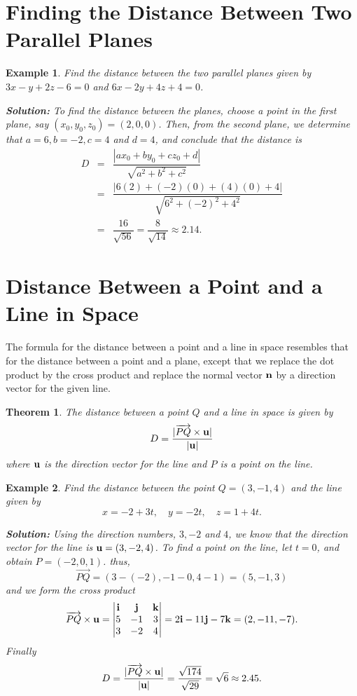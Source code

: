 \documentclass[titlepage,a4paper,12pt]{report}
\newtheorem{example}{Example}[section]
\newtheorem{theorem}{Theorem}[section]
\begin{document}
\section{Finding the Distance Between Two Parallel Planes}
\begin{example}
Find the distance between the two parallel planes given by $3x-y+2z-6=0$ and $6x-2y+4z+4=0$.

\noindent \textbf{Solution:} To find the distance between the planes, choose a point in the first plane, say $(x_0,y_0,z_0)=(2,0,0)$. Then, from the second plane, we determine that $a=6, b=-2, c=4$ and $d=4$, and conclude that the distance is 
\begin{eqnarray*}
D &=& \dfrac{|ax_0+by_0+cz_0+d|}{\sqrt{a^2+b^2+c^2}} \\
&=& \dfrac{|6(2)+(-2)(0)+(4)(0)+4|}{\sqrt{6^2+(-2)^2+4^2}}\\
&=& \dfrac{16}{\sqrt{56}} =\dfrac{8}{\sqrt{14}} \approx 2.14.
\end{eqnarray*}
\end{example}
\section{Distance Between a Point and a Line in Space }
The formula for the distance between a point and a line in space resembles that for the distance between a point and a plane, except that we replace the dot product by the cross product and replace the normal vector ${\bf{n}}$ by a direction vector for the given line. 
\begin{theorem}
The distance between a point $Q$ and a line in space is given by 
\[D=\dfrac{|\overrightarrow{PQ}\times {\bf{u}}|}{|{\bf{u}}|}\] where ${\bf{u}}$ is the direction vector for the line and $P$ is a point on the line.
\end{theorem}
\begin{example}
Find the distance between the point $Q=(3,-1,4)$ and the line given by 
\[x=-2+3t, \quad y=-2t, \quad z=1+4t.\]

\noindent \textbf{Solution:} Using the direction numbers, $3, -2$ and $4$, we know that the direction vector for the line is ${\bf{u}}=(3,-2,4)$. To find a point on the line, let $t=0$, and obtain $P=(-2,0,1)$. thus, 
\[\overrightarrow{PQ}=(3-(-2), -1-0,4-1)=(5,-1,3)\] and we form the cross product 
\[\overrightarrow{PQ} \times {\bf{u}} =\begin{vmatrix}
{\bf{i}} & {\bf{j}} & {\bf{k}} \\
5 & -1 & 3 \\
3 & -2 & 4
\end{vmatrix}=2{\bf{i}}-11{\bf{j}}-7{\bf{k}}=(2,-11,-7).\] Finally 
\[D=\dfrac{|\overrightarrow{PQ}\times {\bf{u}}|}{|{\bf{u}}|} =\dfrac{\sqrt{174}}{\sqrt{29}} =\sqrt{6}\approx 2.45.\]
\end{example}
\end{document}

